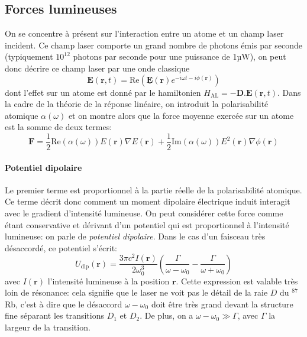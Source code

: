 \subsection{Forces lumineuses}
\label{sc:forces_lumineuses}
On se concentre à présent sur l'interaction entre un atome et un champ laser incident. Ce champ laser comporte un grand nombre de photons émis par seconde (typiquement $10^{12}$ photons par seconde pour une puissance de 1µW), on peut donc décrire ce champ laser par une onde classique 
\begin{equation}
\mathbf{E}(\mathbf{r},t)= \mathrm{Re} \left( \underline{\mathbf{E}}(\mathbf{r}) e^{-i \omega t - i\phi (\mathbf{r})} \right)
\end{equation}
dont l'effet sur un atome est donné par le hamiltonien $H_{\mathrm{AL}}=-\mathbf{D}.\mathbf{E}(\mathbf{r},t)$. 
Dans la cadre de la théorie de la réponse linéaire, on introduit la polarisabilité atomique $\alpha(\omega)$ et on montre alors que la force moyenne exercée sur un atome est la somme de deux termes:
\begin{equation}
\mathbf{F}=\frac{1}{2} \mathrm{Re}(\alpha(\omega)) E(\mathbf{r}) \nabla E(\mathbf{r})+\frac{1}{2}\mathrm{Im}(\alpha(\omega)) E^2(\mathbf{r}) \nabla \phi(\mathbf{r})
\label{eq:forces_lumineuses}
\end{equation}

\paragraph*{Potentiel dipolaire}
Le premier terme est proportionnel à la partie réelle de la polarisabilité atomique. Ce terme décrit donc comment un moment dipolaire électrique induit interagit avec le gradient d'intensité lumineuse. On peut considérer cette force comme étant conservative et dérivant d'un potentiel qui est proportionnel à l'intensité lumineuse: on parle de \emph{potentiel dipolaire}. Dans le cas d'un faisceau très désaccordé, ce potentiel s'écrit:
\begin{equation}
U_{\mathrm{dip}}(\mathbf{r})=\frac{3\pi c^2 I(\mathbf{r})}{2 \omega_0^3} \left( \frac{\Gamma}{\omega - \omega_0} - \frac{\Gamma}{\omega + \omega_0} \right)
\end{equation}
avec $I(\mathbf{r})$ l'intensité lumineuse à la position $\mathbf{r}$. Cette expression est valable très loin de résonance: cela signifie que le laser ne voit pas le détail de la raie $D$ du ${}^{87}$Rb, c'est à dire que le désaccord $\omega-\omega_0$ doit être très grand devant la structure fine séparant les transitions $D_1$ et $D_2$. De plus, on a $\omega-\omega_0 \gg \Gamma$, avec $\Gamma$ la largeur de la transition.

